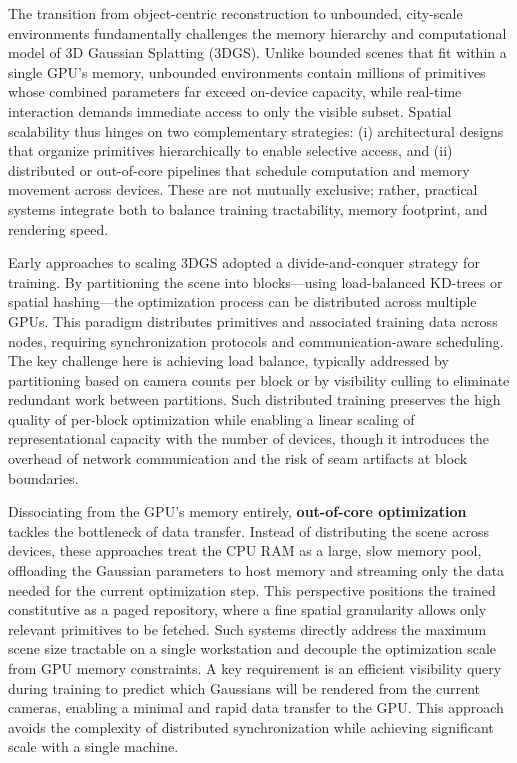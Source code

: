 \documentclass[11pt,a4paper]{article}
\begin{document}
The transition from object-centric reconstruction to unbounded, city-scale environments fundamentally challenges the memory hierarchy and computational model of 3D Gaussian Splatting (3DGS). Unlike bounded scenes that fit within a single GPU's memory, unbounded environments contain millions of primitives whose combined parameters far exceed on-device capacity, while real-time interaction demands immediate access to only the visible subset. Spatial scalability thus hinges on two complementary strategies: (i) architectural designs that organize primitives hierarchically to enable selective access, and (ii) distributed or out-of-core pipelines that schedule computation and memory movement across devices. These are not mutually exclusive; rather, practical systems integrate both to balance training tractability, memory footprint, and rendering speed.

Early approaches to scaling 3DGS adopted a divide-and-conquer strategy for training. By partitioning the scene into blocks---using load-balanced KD-trees or spatial hashing---the optimization process can be distributed across multiple GPUs. This paradigm distributes primitives and associated training data across nodes, requiring synchronization protocols and communication-aware scheduling. The key challenge here is achieving load balance, typically addressed by partitioning based on camera counts per block or by visibility culling to eliminate redundant work between partitions. Such distributed training preserves the high quality of per-block optimization while enabling a linear scaling of representational capacity with the number of devices, though it introduces the overhead of network communication and the risk of seam artifacts at block boundaries.

Dissociating from the GPU's memory entirely, \textbf{out-of-core optimization} tackles the bottleneck of data transfer. Instead of distributing the scene across devices, these approaches treat the CPU RAM as a large, slow memory pool, offloading the Gaussian parameters to host memory and streaming only the data needed for the current optimization step. This perspective positions the trained constitutive as a paged repository, where a fine spatial granularity allows only relevant primitives to be fetched. Such systems directly address the maximum scene size tractable on a single workstation and decouple the optimization scale from GPU memory constraints. A key requirement is an efficient visibility query during training to predict which Gaussians will be rendered from the current cameras, enabling a minimal and rapid data transfer to the GPU. This approach avoids the complexity of distributed synchronization while achieving significant scale with a single machine.
\end{document}
